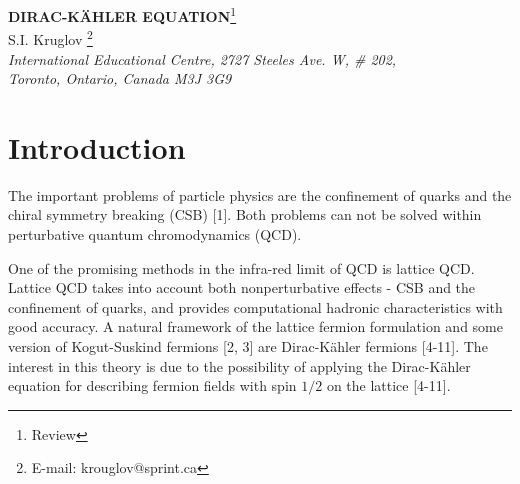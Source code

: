 \documentclass[a4paper,12pt]{article}
\begin{document}
\begin{center}
{\bf DIRAC-K\"AHLER EQUATION}\footnote{Review}\\
\vspace{5mm}
 S.I. Kruglov \footnote{E-mail: krouglov@sprint.ca}\\
\vspace{5mm}
\textit{International Educational Centre, 2727 Steeles Ave. W, \# 202, \\
Toronto, Ontario, Canada M3J 3G9}
\end{center}

\begin{abstract}
Tensor, matrix and quaternion formulations of Dirac-K\"ahler
equation for massive and massless fields are considered. The
equation matrices obtained are simple linear combinations of
matrix elements in the 16-dimensional space. The projection
matrix-dyads defining all the 16 independent equation solutions
are found. A method of computing the traces of 16-dimensional
Petiau-Duffin-Kemmer matrix product is considered. We show that
the symmetry group of the Dirac-K\"ahler tensor fields for charged
particles is $SO(4,2)$ . The conservation currents corresponding
this symmetry are constructed. We analyze transformations of the
Lorentz group and quaternion fields.
Supersymmetry of the Dirac-K\"ahler fields with tensor and spinor
parameters is investigated. We show the possibility of constructing a
gauge model of interacting Dirac-K\"ahler fields where the gauge
group is the noncompact group under consideration.
\end{abstract}

\section{Introduction}

The important problems of particle physics are the confinement of quarks and
the chiral symmetry breaking (CSB) [1]. Both problems can not be solved
within perturbative quantum chromodynamics (QCD).

One of the promising methods in the infra-red limit of QCD is lattice QCD.
Lattice QCD takes into account both nonperturbative effects - CSB and the
confinement of quarks, and provides computational hadronic characteristics
with good accuracy. A natural framework of the lattice fermion formulation
and some version of Kogut-Suskind fermions [2, 3] are Dirac-K\"ahler
fermions [4-11]. The interest in this theory is due to the possibility of
applying the Dirac-K\"ahler equation for describing fermion fields with spin
$1/2$ on the lattice [4-11].
\end{document}
